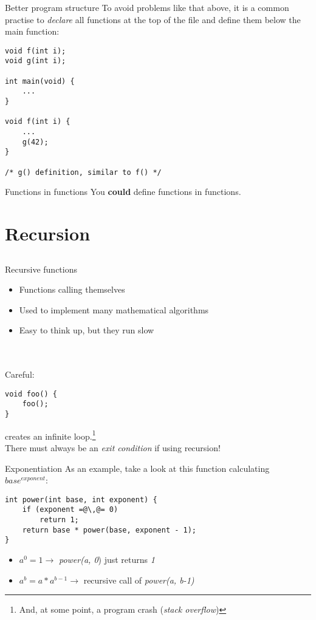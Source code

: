 \begin{frame}[fragile]{Better program structure}
	To avoid problems like that above, it is a common practise to \textit{declare} all functions at the top of the file and define them below the main function:
	\begin{lstlisting}
void f(int i);
void g(int i);

int main(void) {
	...
}

void f(int i) {
	...
	g(42);
}

/* g() definition, similar to f() */
\end{lstlisting}
\end{frame}
\begin{frame}{Functions in functions}
	You \textbf{could} define functions in functions.\footnotemark
	
\end{frame}
\section{Recursion}
\subsection{}
\begin{frame}[fragile]{Recursive functions}
	\begin{itemize}
		\item Functions calling themselves
		\item Used to implement many mathematical algorithms
		\item Easy to think up, but they run slow
	\end{itemize} \ \\ \ \\
	Careful:
	\begin{lstlisting}
void foo() {
	foo();
}
\end{lstlisting}
	creates an infinite loop.\footnote{And, at some point, a program crash (\textit{stack overflow})} \\
	There must always be an \textit{exit condition} if using recursion!
\end{frame}
\begin{frame}[fragile]{Exponentiation}
As an example, take a look at this function calculating $base^{exponent}$:
	\begin{lstlisting}
int power(int base, int exponent) {
	if (exponent =@\,@= 0)
		return 1;
	return base * power(base, exponent - 1);
}
\end{lstlisting}
	\begin{itemize}
		\item $a^{0} = 1 \rightarrow$ \textit{power(a, 0}) just returns \textit{1}
		\item $a^{b} = a * a^{b-1} \rightarrow$ recursive call of \textit{power(a, b-1)}
	\end{itemize}
\end{frame}
